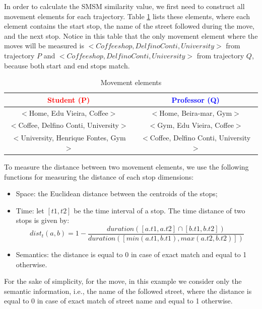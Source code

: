 \documentclass[12pt]{article}
\begin{document}
In order to calculate the SMSM similarity value, we first need to construct all movement elements for each trajectory. Table \ref{tab:SMSM_tuples} lists these elements, where each element contains the start stop, the name of the street followed during the move, and the next stop. Notice in this table that the only movement element where the moves will be measured is $<Coffee shop, Delfino Conti, University>$ from trajectory $P$ and $<Coffee shop, Delfino Conti, University>$ from trajectory $Q$, because both start and end stops match.

\begin{table}[h!]
\scriptsize
  \centering
  \begin{tabular}{|c|c|}
  	\hline
		\textcolor{Red}{\textbf{Student (P)}} & \textcolor{Blue}{\textbf{Professor (Q)}}\\
  	\hline
      $<$Home, Edu Vieira, Coffee$>$&$<$Home, Beira-mar, Gym$>$\\
      $<$Coffee, Delfino Conti, University$>$&$<$Gym, Edu Vieira, Coffee$>$\\
      $<$University, Henrique Fontes, Gym$>$&$<$Coffee, Delfino Conti, University$>$\\
  	\hline
  \end{tabular}
  \label{tab:wrong}
  \caption{Movement elements}
  \label{tab:SMSM_tuples}
\end{table}

To measure the distance between two movement elements, we use the following functions for measuring the distance of each stop dimensions: 
\begin{itemize}
  \item Space: the Euclidean distance between the centroids of the stops;
  \item Time: let $[t1, t2]$ be the time interval of a stop. The time distance of two stops is given by:
\begin{equation} \label{eq:time_interval}
	dist_t(a, b) = 1 - \dfrac{duration([a.t1, a.t2] \cap [b.t1, b.t2])}{duration([min(a.t1, b.t1), max(a.t2, b.t2)])}
\end{equation}
  \item Semantics: the distance is equal to 0 in case of exact match and equal to 1 otherwise.
\end{itemize}

For the sake of simplicity, for the move, in this example we consider only the semantic information, i.e., the name of the followed street, where the distance is equal to 0 in case of exact match of street name and equal to 1 otherwise.
\end{document}
